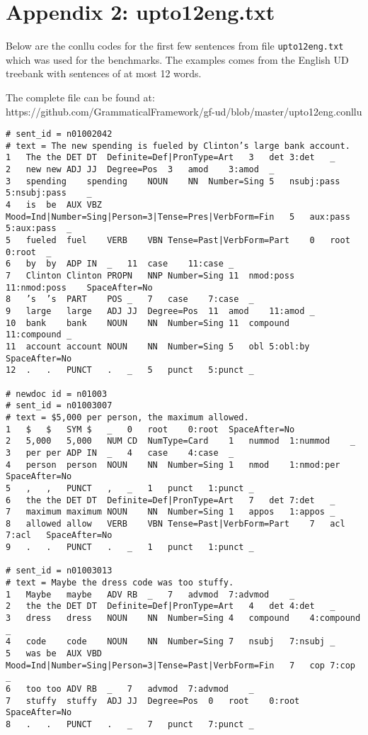 \chapter{Appendix 2: upto12eng.txt}\label{app:upto12}

Below are the conllu codes for the first few sentences from file \verb|upto12eng.txt| which was used for the benchmarks. The examples comes from the English UD treebank with sentences of at most 12 words.

The complete file can be found at: https://github.com/GrammaticalFramework/gf-ud/blob/master/upto12eng.conllu

\begin{verbatim}
# sent_id = n01002042
# text = The new spending is fueled by Clinton’s large bank account.
1	The	the	DET	DT	Definite=Def|PronType=Art	3	det	3:det	_
2	new	new	ADJ	JJ	Degree=Pos	3	amod	3:amod	_
3	spending	spending	NOUN	NN	Number=Sing	5	nsubj:pass	5:nsubj:pass	_
4	is	be	AUX	VBZ	Mood=Ind|Number=Sing|Person=3|Tense=Pres|VerbForm=Fin	5	aux:pass	5:aux:pass	_
5	fueled	fuel	VERB	VBN	Tense=Past|VerbForm=Part	0	root	0:root	_
6	by	by	ADP	IN	_	11	case	11:case	_
7	Clinton	Clinton	PROPN	NNP	Number=Sing	11	nmod:poss	11:nmod:poss	SpaceAfter=No
8	’s	’s	PART	POS	_	7	case	7:case	_
9	large	large	ADJ	JJ	Degree=Pos	11	amod	11:amod	_
10	bank	bank	NOUN	NN	Number=Sing	11	compound	11:compound	_
11	account	account	NOUN	NN	Number=Sing	5	obl	5:obl:by	SpaceAfter=No
12	.	.	PUNCT	.	_	5	punct	5:punct	_

# newdoc id = n01003
# sent_id = n01003007
# text = $5,000 per person, the maximum allowed.
1	$	$	SYM	$	_	0	root	0:root	SpaceAfter=No
2	5,000	5,000	NUM	CD	NumType=Card	1	nummod	1:nummod	_
3	per	per	ADP	IN	_	4	case	4:case	_
4	person	person	NOUN	NN	Number=Sing	1	nmod	1:nmod:per	SpaceAfter=No
5	,	,	PUNCT	,	_	1	punct	1:punct	_
6	the	the	DET	DT	Definite=Def|PronType=Art	7	det	7:det	_
7	maximum	maximum	NOUN	NN	Number=Sing	1	appos	1:appos	_
8	allowed	allow	VERB	VBN	Tense=Past|VerbForm=Part	7	acl	7:acl	SpaceAfter=No
9	.	.	PUNCT	.	_	1	punct	1:punct	_

# sent_id = n01003013
# text = Maybe the dress code was too stuffy.
1	Maybe	maybe	ADV	RB	_	7	advmod	7:advmod	_
2	the	the	DET	DT	Definite=Def|PronType=Art	4	det	4:det	_
3	dress	dress	NOUN	NN	Number=Sing	4	compound	4:compound	_
4	code	code	NOUN	NN	Number=Sing	7	nsubj	7:nsubj	_
5	was	be	AUX	VBD	Mood=Ind|Number=Sing|Person=3|Tense=Past|VerbForm=Fin	7	cop	7:cop	_
6	too	too	ADV	RB	_	7	advmod	7:advmod	_
7	stuffy	stuffy	ADJ	JJ	Degree=Pos	0	root	0:root	SpaceAfter=No
8	.	.	PUNCT	.	_	7	punct	7:punct	_

\end{verbatim}
